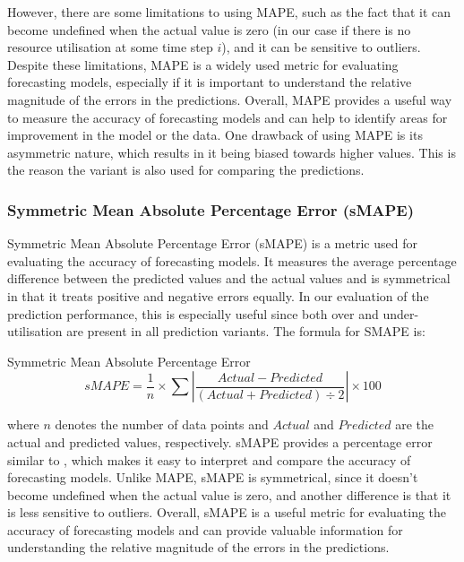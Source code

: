       However, there are some limitations to using MAPE, such as the fact that it can become undefined when the actual value is zero (in our case if there is no resource utilisation at some time step $i$), and it can be sensitive to outliers.
      Despite these limitations, MAPE is a widely used metric for evaluating forecasting models, especially if it is important to understand the relative magnitude of the errors in the predictions. 
      Overall, MAPE provides a useful way to measure the accuracy of forecasting models and can help to identify areas for improvement in the model or the data.
      One drawback of using MAPE is its asymmetric nature, which results in it being biased towards higher values.
      This is the reason the variant  is also used for comparing the predictions.


    \subsubsection{Symmetric Mean Absolute Percentage Error (sMAPE)}
    \label{sec:smape-metrics-evaluation}
    
      Symmetric Mean Absolute Percentage Error (sMAPE) \cite{kreinovichHowEstimateForecasting2014} is a metric used for evaluating the accuracy of forecasting models. It measures the average percentage difference between the predicted values and the actual values and is symmetrical in that it treats positive and negative errors equally.
      In our evaluation of the prediction performance, this is especially useful since both over and under-utilisation are present in all prediction variants.
      The formula for SMAPE is:

      \begin{pabox}{Symmetric Mean Absolute Percentage Error}
        $$sMAPE = \frac{1}{n} \times \sum \left|\frac{Actual - Predicted}{\left(Actual + Predicted\right) \div 2}\right| \times 100$$
      \end{pabox}
      where $n$ denotes the number of data points and $Actual$ and $Predicted$ are the actual and predicted values, respectively.
      sMAPE provides a percentage error similar to , which makes it easy to interpret and compare the accuracy of forecasting models. Unlike MAPE, sMAPE is symmetrical, since it doesn't become undefined when the actual value is zero, and another difference is that it is less sensitive to outliers.
      Overall, sMAPE is a useful metric for evaluating the accuracy of forecasting models and can provide valuable information for understanding the relative magnitude of the errors in the predictions.



